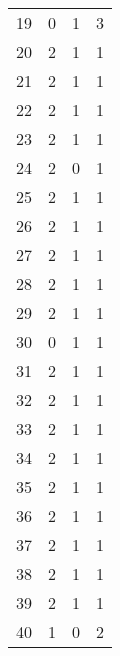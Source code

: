 \begin{longtable}{cp{3cm}p{3cm}p{3cm}}
19 &                      0 &                      1 &                      3 \\
20 &                      2 &                      1 &                      1 \\
21 &                      2 &                      1 &                      1 \\
22 &                      2 &                      1 &                      1 \\
23 &                      2 &                      1 &                      1 \\
24 &                      2 &                      0 &                      1 \\
25 &                      2 &                      1 &                      1 \\
26 &                      2 &                      1 &                      1 \\
27 &                      2 &                      1 &                      1 \\
28 &                      2 &                      1 &                      1 \\
29 &                      2 &                      1 &                      1 \\
30 &                      0 &                      1 &                      1 \\
31 &                      2 &                      1 &                      1 \\
32 &                      2 &                      1 &                      1 \\
33 &                      2 &                      1 &                      1 \\
34 &                      2 &                      1 &                      1 \\
35 &                      2 &                      1 &                      1 \\
36 &                      2 &                      1 &                      1 \\
37 &                      2 &                      1 &                      1 \\
38 &                      2 &                      1 &                      1 \\
39 &                      2 &                      1 &                      1 \\
40 &                      1 &                      0 &                      2 \\

\end{longtable}
